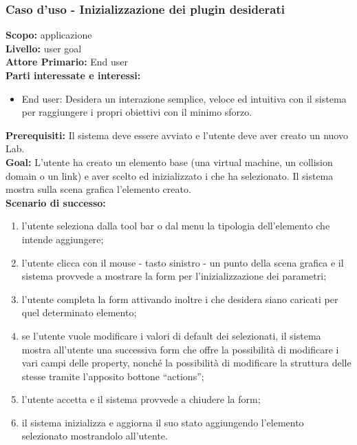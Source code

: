 \begin{flushleft}
\begin{boxedminipage}{\textwidth}

\subsubsection*{Caso d'uso - Inizializzazione dei plugin desiderati}

\textbf{Scopo:} applicazione \visualnetkit{} \\
\textbf{Livello:} user goal \\
\textbf{Attore Primario:} End user \\
\textbf{Parti interessate e interessi:}
\begin{itemize}
\item End user: Desidera un interazione semplice, veloce ed intuitiva con il sistema per raggiungere i propri obiettivi con il minimo sforzo.
\end{itemize}

\textbf{Prerequisiti:} Il sistema deve essere avviato e l'utente deve aver creato un nuovo Lab. \\
\textbf{Goal:} L'utente ha creato un elemento base (una virtual machine, un collision domain o un link) e aver scelto ed inizializzato i \plugin{} che ha selezionato. Il sistema mostra sulla scena grafica l'elemento creato. \\

\textbf{Scenario di successo:}
\begin{enumerate}
\item l'utente seleziona dalla tool bar o dal menu la tipologia dell'elemento che intende aggiungere;
\item l'utente clicca con il mouse - tasto sinistro - un punto della scena grafica e il sistema provvede a mostrare la form per l'inizializzazione dei parametri;
\item l'utente completa la form attivando inoltre i \plugin{} che desidera siano caricati per quel determinato elemento;
\item se l'utente vuole modificare i valori di default dei \plugin{} selezionati, il sistema mostra all'utente una successiva form che offre la possibilità di modificare i vari campi delle property, nonché la possibilità di modificare la struttura delle stesse tramite l'apposito bottone ``actions'';
\item l'utente accetta e il sistema provvede a chiudere la form;
\item il sistema inizializza e aggiorna il suo stato aggiungendo l'elemento selezionato mostrandolo all'utente.
\end{enumerate}

\end{boxedminipage}
\end{flushleft}

